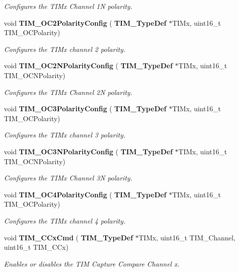 \begin{DoxyCompactItemize}
\begin{DoxyCompactList}\small\item\em Configures the T\+I\+Mx Channel 1N polarity. \end{DoxyCompactList}\item 
void \textbf{ T\+I\+M\+\_\+\+O\+C2\+Polarity\+Config} (\textbf{ T\+I\+M\+\_\+\+Type\+Def} $\ast$T\+I\+Mx, uint16\+\_\+t T\+I\+M\+\_\+\+O\+C\+Polarity)
\begin{DoxyCompactList}\small\item\em Configures the T\+I\+Mx channel 2 polarity. \end{DoxyCompactList}\item 
void \textbf{ T\+I\+M\+\_\+\+O\+C2\+N\+Polarity\+Config} (\textbf{ T\+I\+M\+\_\+\+Type\+Def} $\ast$T\+I\+Mx, uint16\+\_\+t T\+I\+M\+\_\+\+O\+C\+N\+Polarity)
\begin{DoxyCompactList}\small\item\em Configures the T\+I\+Mx Channel 2N polarity. \end{DoxyCompactList}\item 
void \textbf{ T\+I\+M\+\_\+\+O\+C3\+Polarity\+Config} (\textbf{ T\+I\+M\+\_\+\+Type\+Def} $\ast$T\+I\+Mx, uint16\+\_\+t T\+I\+M\+\_\+\+O\+C\+Polarity)
\begin{DoxyCompactList}\small\item\em Configures the T\+I\+Mx channel 3 polarity. \end{DoxyCompactList}\item 
void \textbf{ T\+I\+M\+\_\+\+O\+C3\+N\+Polarity\+Config} (\textbf{ T\+I\+M\+\_\+\+Type\+Def} $\ast$T\+I\+Mx, uint16\+\_\+t T\+I\+M\+\_\+\+O\+C\+N\+Polarity)
\begin{DoxyCompactList}\small\item\em Configures the T\+I\+Mx Channel 3N polarity. \end{DoxyCompactList}\item 
void \textbf{ T\+I\+M\+\_\+\+O\+C4\+Polarity\+Config} (\textbf{ T\+I\+M\+\_\+\+Type\+Def} $\ast$T\+I\+Mx, uint16\+\_\+t T\+I\+M\+\_\+\+O\+C\+Polarity)
\begin{DoxyCompactList}\small\item\em Configures the T\+I\+Mx channel 4 polarity. \end{DoxyCompactList}\item 
void \textbf{ T\+I\+M\+\_\+\+C\+Cx\+Cmd} (\textbf{ T\+I\+M\+\_\+\+Type\+Def} $\ast$T\+I\+Mx, uint16\+\_\+t T\+I\+M\+\_\+\+Channel, uint16\+\_\+t T\+I\+M\+\_\+\+C\+Cx)
\begin{DoxyCompactList}\small\item\em Enables or disables the T\+IM Capture Compare Channel x. \end{DoxyCompactList}\item 

\end{DoxyCompactItemize}
